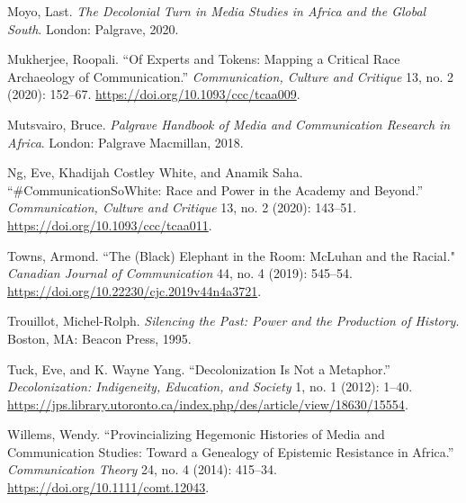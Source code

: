 \documentclass{tufte-handout}
\begin{document}
\begin{hangparas}{.25in}{1}
Moyo, Last. \emph{The Decolonial Turn in Media Studies in Africa and the
Global South}. London: Palgrave, 2020.

Mukherjee, Roopali. ``Of Experts and Tokens: Mapping a Critical Race
Archaeology of Communication.'' \emph{Communication, Culture and
Critique} 13, no. 2 (2020): 152--67.
\url{https://doi.org/10.1093/ccc/tcaa009}.

Mutsvairo, Bruce. \emph{Palgrave Handbook of Media and Communication
Research in Africa}. London: Palgrave Macmillan, 2018.

Ng, Eve, Khadijah Costley White, and Anamik Saha.
``\#CommunicationSoWhite: Race and Power in the Academy and Beyond.''
\emph{Communication, Culture and Critique} 13, no. 2 (2020): 143--51.
\url{https://doi.org/10.1093/ccc/tcaa011}.

Towns, Armond. ``The (Black) Elephant in the Room: McLuhan and the
Racial." \emph{Canadian Journal of Communication} 44, no. 4 (2019):
545--54. \url{https://doi.org/10.22230/cjc.2019v44n4a3721}.

Trouillot, Michel-Rolph. \emph{Silencing the Past: Power and the
Production of History}. Boston, MA: Beacon Press, 1995.

Tuck, Eve, and K. Wayne Yang. ``Decolonization Is Not a Metaphor.''
\emph{Decolonization: Indigeneity, Education, and Society} 1, no. 1
(2012): 1--40.
\url{https://jps.library.utoronto.ca/index.php/des/article/view/18630/15554}.

Willems, Wendy. ``Provincializing Hegemonic Histories of Media and
Communication Studies: Toward a Genealogy of Epistemic Resistance in
Africa.'' \emph{Communication Theory} 24, no. 4 (2014): 415--34.
\url{https://doi.org/10.1111/comt.12043}.



\end{hangparas}
\end{document}
